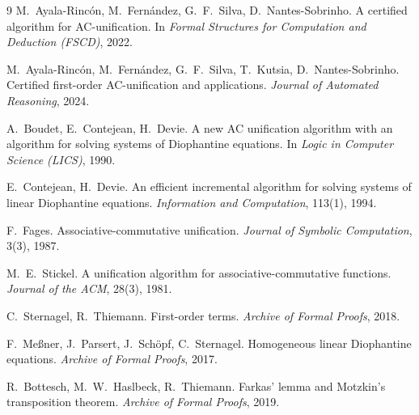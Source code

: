 \documentclass[11pt,a4paper]{article}
\theoremstyle{definition}
\theoremstyle{remark}
\begin{document}
\begin{thebibliography}{9}
M.~Ayala-Rinc\'on, M.~Fern\'andez, G.~F.~Silva, D.~Nantes-Sobrinho.
\newblock A certified algorithm for AC-unification.
\newblock In \emph{Formal Structures for Computation and Deduction (FSCD)}, 2022.

M.~Ayala-Rinc\'on, M.~Fern\'andez, G.~F.~Silva, T.~Kutsia, D.~Nantes-Sobrinho.
\newblock Certified first-order AC-unification and applications.
\newblock \emph{Journal of Automated Reasoning}, 2024.

A.~Boudet, E.~Contejean, H.~Devie.
\newblock A new AC unification algorithm with an algorithm for solving systems of Diophantine
equations.
\newblock In \emph{Logic in Computer Science (LICS)}, 1990.

E.~Contejean, H.~Devie.
\newblock An efficient incremental algorithm for solving systems of linear Diophantine equations.
\newblock \emph{Information and Computation}, 113(1), 1994.

F.~Fages.
\newblock Associative-commutative unification.
\newblock \emph{Journal of Symbolic Computation}, 3(3), 1987.

M.~E.~Stickel.
\newblock A unification algorithm for associative-commutative functions.
\newblock \emph{Journal of the ACM}, 28(3), 1981.

C.~Sternagel, R.~Thiemann.
\newblock First-order terms.
\newblock \emph{Archive of Formal Proofs}, 2018.

F.~Me{\ss}ner, J.~Parsert, J.~Sch\"opf, C.~Sternagel.
\newblock Homogeneous linear Diophantine equations.
\newblock \emph{Archive of Formal Proofs}, 2017.

R.~Bottesch, M.~W.~Haslbeck, R.~Thiemann.
\newblock Farkas' lemma and Motzkin's transposition theorem.
\newblock \emph{Archive of Formal Proofs}, 2019.
\end{thebibliography}
\end{document}
